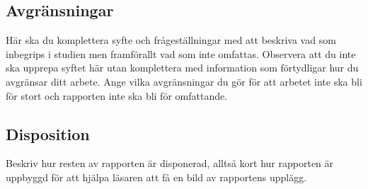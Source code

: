 \subsection{Avgränsningar}
Här ska du komplettera syfte och frågeställningar med att beskriva vad som inbegrips i studien men framförallt vad som inte omfattas. Observera att du inte ska upprepa syftet här utan komplettera med information som förtydligar hur du avgränsar ditt arbete. Ange vilka avgränsningar   du gör för att arbetet inte ska bli för stort och rapporten inte ska bli för omfattande.

\subsection{Disposition}
Beskriv hur resten av rapporten är disponerad, alltså kort hur rapporten är uppbyggd för att hjälpa läsaren att få en bild av rapportens upplägg.